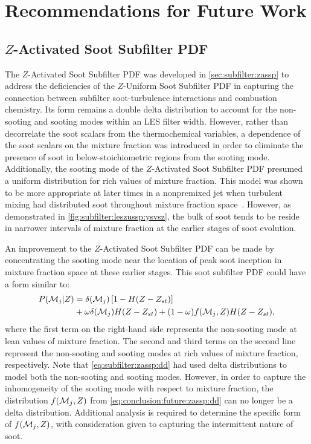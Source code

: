 \section{Recommendations for Future Work}
\label{sec:conclusion:future}

\subsection{$Z$-Activated Soot Subfilter PDF}
\label{sec:conclusion:future:zassp}

The $Z$-Activated Soot Subfilter PDF was developed in \cref{sec:subfilter:zassp} to address the deficiencies of the $Z$-Uniform Soot Subfilter PDF in capturing the connection between subfilter soot-turbulence interactions and combustion chemistry. Its form remains a double delta distribution to account for the non-sooting and sooting modes within an LES filter width. However, rather than decorrelate the soot scalars from the thermochemical variables, a dependence of the soot scalars on the mixture fraction was introduced in order to eliminate the presence of soot in below-stoichiometric regions from the sooting mode. Additionally, the sooting mode of the $Z$-Activated Soot Subfilter PDF presumed a uniform distribution for rich values of mixture fraction. This model was shown to be more appropriate at later times in a nonpremixed jet when turbulent mixing had distributed soot throughout mixture fraction space~\cite{attili2014}. However, as demonstrated in \cref{fig:subfilter:leszussp:ysvsz}, the bulk of soot tends to be reside in narrower intervals of mixture fraction at the earlier stages of soot evolution.

An improvement to the $Z$-Activated Soot Subfilter PDF can be made by concentrating the sooting mode near the location of peak soot inception in mixture fraction space at these earlier stages. This soot subfilter PDF could have a form similar to:
\begin{equation}\label{eq:conclusion:future:zassp:dd}
  \begin{split}
    P(\mathcal{M}_j|Z) &= \delta(\mathcal{M}_j)\left[ 1 - H(Z - Z_{st}) \right] \\
    &+ \omega\delta(\mathcal{M}_j)H(Z - Z_{st}) + (1 - \omega)f(\mathcal{M}_j, Z)H(Z - Z_{st}),
  \end{split}
\end{equation}
where the first term on the right-hand side represents the non-sooting mode at lean values of mixture fraction. The second and third terms on the second line represent the non-sooting and sooting modes at rich values of mixture fraction, respectively. Note that \cref{eq:subfilter:zassp:dd} had used delta distributions to model both the non-sooting and sooting modes. However, in order to capture the inhomogeneity of the sooting mode with respect to mixture fraction, the distribution $f(\mathcal{M}_j, Z)$ from \cref{eq:conclusion:future:zassp:dd} can no longer be a delta distribution. Additional analysis is required to determine the specific form of $f(\mathcal{M}_j, Z)$, with consideration given to capturing the intermittent nature of soot.

